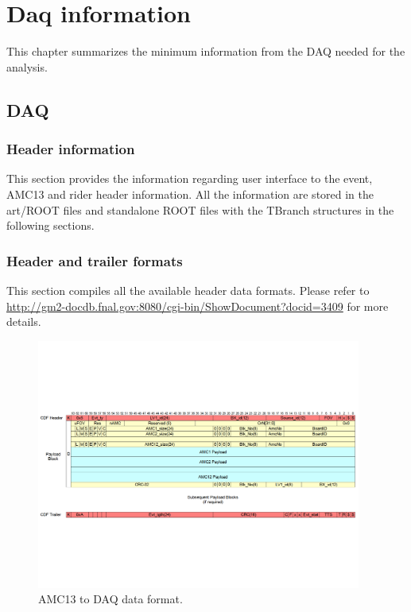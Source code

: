 \chapter{Daq information}
\label{app:three}

This chapter summarizes the minimum information from the DAQ needed for the analysis.

\section{DAQ}

\subsection{Header information}
This section provides the information regarding user interface to the event, AMC13 and rider header information. All the information are stored in the art/ROOT files and standalone ROOT files with the TBranch structures in the following sections.

\subsection{Header and trailer formats}

This section compiles all the available header data formats. Please refer to \url{http://gm2-docdb.fnal.gov:8080/cgi-bin/ShowDocument?docid=3409} for more details.

\begin{figure}[htbp]
\centering
\includegraphics[trim=0cm 6cm 0cm 6cm ,width=0.95\textwidth]{pics/AMC13Header}
\caption{AMC13 to DAQ data format.}
\end{figure}

